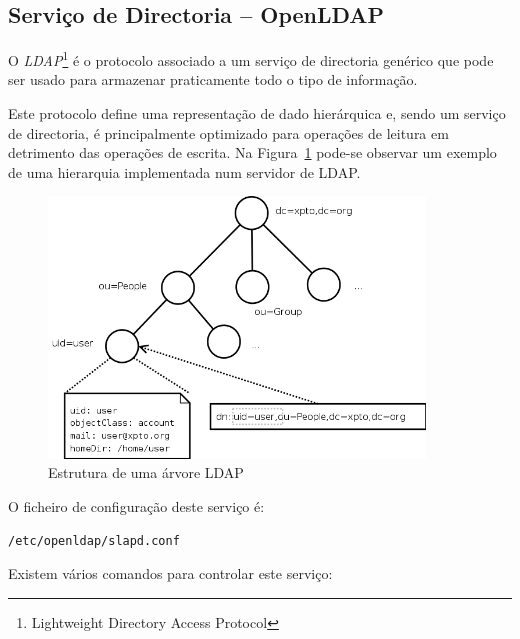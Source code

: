 \subsection{Serviço de Directoria -- OpenLDAP}

O \emph{LDAP}\footnote{Lightweight Directory Access Protocol} é o protocolo associado
a um serviço de directoria genérico que pode ser usado para armazenar praticamente todo
o tipo de informação.

Este protocolo define uma representação de dado hierárquica e, sendo um serviço de
directoria, é principalmente optimizado para operações de leitura em detrimento
das operações de escrita.
Na Figura~\ref{fig:ldap} pode-se observar um exemplo de uma hierarquia implementada
num servidor de LDAP.

\begin{figure}[H]
\begin{center}
\includegraphics[width=10cm]{include/img/ldap}
\end{center}
\caption{Estrutura de uma árvore LDAP}
\label{fig:ldap}
\end{figure}

O ficheiro de configuração deste serviço é:

\texttt{/etc/openldap/slapd.conf}

Existem vários comandos para controlar este serviço:


